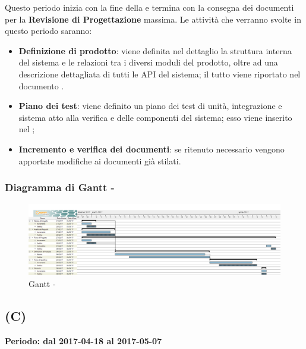 \documentclass[./PianoDiProgetto.tex]{subfiles}
\begin{document}
  Questo periodo inizia con la fine della \PerPA{} e termina con la consegna dei documenti per la \textbf{Revisione di Progettazione} massima. Le attività che verranno svolte in questo periodo saranno:
  \begin{itemize}
    \item \textbf{Definizione di prodotto}: viene definita nel dettaglio la struttura interna del sistema e le relazioni tra i diversi moduli del prodotto, oltre ad una descrizione dettagliata di tutti le API del sistema; il tutto viene riportato nel documento \DPdocRP.
    \item \textbf{Piano dei test}: viene definito un piano dei test di unità, integrazione e sistema atto alla verifica e  delle componenti del sistema; esso viene inserito nel \PQdocRP{};
    \item \textbf{Incremento e verifica dei documenti}: se ritenuto necessario vengono apportate modifiche ai documenti già stilati.
  \end{itemize}
\newpage
  \subsubsection{Diagramma di Gantt - \PerPD}
    \begin{figure}[!h]
    \centering
    \includegraphics[width=\textwidth]{images/PD}
    \caption{Gantt - \PerPD}
    \end{figure}

  \subsection{\PerC{} (C)}
  \textbf{Periodo: dal 2017-04-18 al 2017-05-07}
\end{document}

